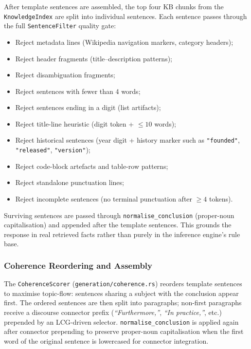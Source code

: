 \documentclass[11pt,a4paper]{article}
\begin{document}
After template sentences are assembled, the top four KB chunks from the
\texttt{KnowledgeIndex} are split into individual sentences. Each sentence passes through
the full \texttt{SentenceFilter} quality gate:
\begin{itemize}[noitemsep,topsep=4pt]
  \item Reject metadata lines (Wikipedia navigation markers, category headers);
  \item Reject header fragments (title--description patterns);
  \item Reject disambiguation fragments;
  \item Reject sentences with fewer than 4 words;
  \item Reject sentences ending in a digit (list artifacts);
  \item Reject title-line heuristic (digit token + $\leq 10$ words);
  \item Reject historical sentences (year digit + history marker such as \texttt{"founded"},
        \texttt{"released"}, \texttt{"version"});
  \item Reject code-block artefacts and table-row patterns;
  \item Reject standalone punctuation lines;
  \item Reject incomplete sentences (no terminal punctuation after $\geq 4$ tokens).
\end{itemize}
Surviving sentences are passed through \texttt{normalise\_conclusion} (proper-noun
capitalisation) and appended after the template sentences. This grounds the response in
real retrieved facts rather than purely in the inference engine's rule base.

\subsubsection{Coherence Reordering and Assembly}

The \texttt{CoherenceScorer} (\texttt{generation/coherence.rs}) reorders template sentences
to maximise topic-flow: sentences sharing a subject with the conclusion appear first.
The ordered sentences are then split into paragraphs; non-first paragraphs receive a
discourse connector prefix (\textit{``Furthermore,''}, \textit{``In practice,''}, etc.)
prepended by an LCG-driven selector. \texttt{normalise\_conclusion} is applied again after
connector prepending to preserve proper-noun capitalisation when the first word of the original
sentence is lowercased for connector integration.
\end{document}
